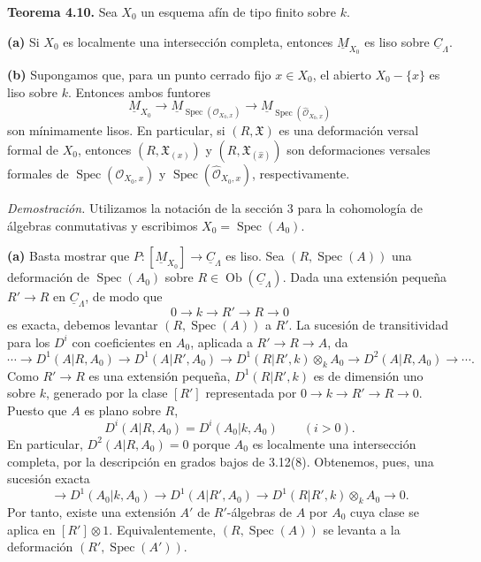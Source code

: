 
\medskip
\noindent\textbf{Teorema 4.10.}
Sea $X_0$ un esquema afín de tipo finito sobre $k$.

\smallskip
\noindent\textbf{(a)}
Si $X_0$ es localmente una intersección completa, entonces
$\underline M_{X_0}$ es liso sobre $\underline C_\Lambda$.

\smallskip
\noindent\textbf{(b)}
Supongamos que, para un punto cerrado fijo $x\in X_0$, el abierto
$X_0-\{x\}$ es liso sobre $k$. Entonces ambos funtores
\[
\underline M_{X_0}
\longrightarrow
\underline M_{\operatorname{Spec}(\mathcal O_{X_0,x})}
\longrightarrow
\underline M_{\operatorname{Spec}(\widehat{\mathcal O}_{X_0,x})}
\]
son mínimamente lisos. En particular, si $(R,\mathfrak X)$ es una
deformación versal formal de $X_0$, entonces $(R,\mathfrak X_{(x)})$
y $(R,\mathfrak X_{(\widehat x)})$ son deformaciones versales
formales de $\operatorname{Spec}(\mathcal O_{X_0,x})$ y
$\operatorname{Spec}(\widehat{\mathcal O}_{X_0,x})$,
respectivamente.

\medskip
\noindent\textit{Demostración.}
Utilizamos la notación de la sección 3 para la cohomología de álgebras
conmutativas y escribimos $X_0=\operatorname{Spec}(A_0)$.


\smallskip
\noindent\textbf{(a)}
Basta mostrar que
$P:[\underline M_{X_0}]\longrightarrow\underline C_\Lambda$ es
liso. Sea $(R,\operatorname{Spec}(A))$ una deformación de
$\operatorname{Spec}(A_0)$ sobre
$R\in\operatorname{Ob}(\underline C_\Lambda)$. Dada una extensión
pequeña $R'\longrightarrow R$ en $\underline C_\Lambda$, de modo que
\[
0\longrightarrow k\longrightarrow R'\longrightarrow R
\longrightarrow0
\]
es exacta, debemos levantar $(R,\operatorname{Spec}(A))$ a $R'$. La
sucesión de transitividad para los $D^i$ con coeficientes en $A_0$,
aplicada a $R'\longrightarrow R\longrightarrow A$, da
\[
\cdots\longrightarrow D^1(A|R,A_0)
\longrightarrow D^1(A|R',A_0)
\longrightarrow D^1(R|R',k)\otimes_kA_0
\longrightarrow D^2(A|R,A_0)\longrightarrow\cdots .
\]
Como $R'\longrightarrow R$ es una extensión pequeña,
$D^1(R|R',k)$ es de dimensión uno sobre $k$, generado por la clase
$[R']$ representada por
$0\longrightarrow k\longrightarrow R'\longrightarrow R
\longrightarrow0$. Puesto que $A$ es plano sobre $R$,
\[
D^i(A|R,A_0)=D^i(A_0|k,A_0)
\qquad(i>0).
\]
En particular, $D^2(A|R,A_0)=0$ porque $A_0$ es localmente una
intersección completa, por la descripción en grados bajos de
3.12(8). Obtenemos, pues, una sucesión exacta
\[
\longrightarrow D^1(A_0|k,A_0)
\longrightarrow D^1(A|R',A_0)
\longrightarrow D^1(R|R',k)\otimes_kA_0
\longrightarrow0.
\]
Por tanto, existe una extensión $A'$ de $R'$-álgebras de $A$ por
$A_0$ cuya clase se aplica en $[R']\otimes1$. Equivalentemente,
$(R,\operatorname{Spec}(A))$ se levanta a la deformación
$(R',\operatorname{Spec}(A'))$.

